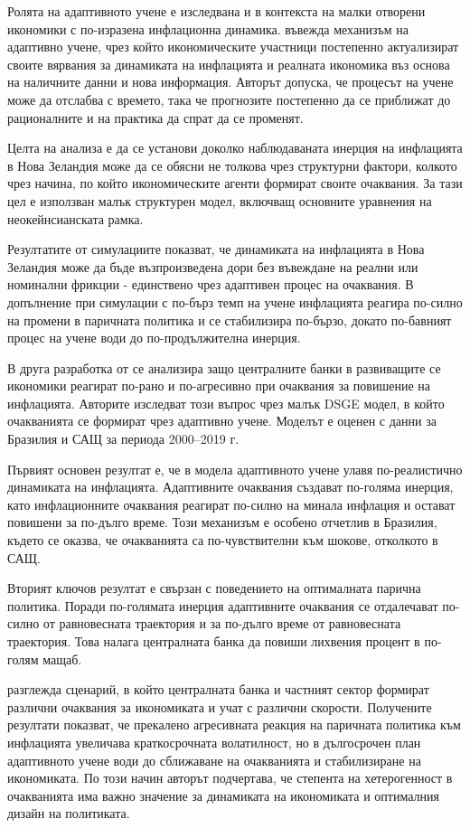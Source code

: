 Ролята на адаптивното учене е изследвана и в контекста на малки отворени икономики с по-изразена инфлационна динамика. \textcite{BASDEVANT20051074}  въвежда механизъм на адаптивно учене, чрез който икономическите участници постепенно актуализират своите вярвания за динамиката на инфлацията и реалната икономика въз основа на наличните данни и нова информация. Авторът допуска, че процесът на учене може да отслабва с времето, така че прогнозите постепенно да се приближат до рационалните и на практика да спрат да се променят. 

Целта на анализа е да се установи доколко наблюдаваната инерция на инфлацията в Нова Зеландия може да се обясни не толкова чрез структурни фактори, колкото чрез начина, по който икономическите агенти формират своите очаквания. За тази цел е използван малък структурен модел, включващ основните уравнения на неокейнсианската рамка.

Резултатите от симулациите показват, че динамиката на инфлацията в Нова Зеландия може да бъде възпроизведена дори без въвеждане на реални или номинални фрикции - единствено чрез адаптивен процес на очаквания. В допълнение при симулации с по-бърз темп на учене инфлацията реагира по-силно на промени в паричната политика и се стабилизира по-бързо, докато по-бавният процес на учене води до по-продължителна инерция.

В друга разработка от \textcite{DIZIOLI2024100119} се анализира защо централните банки в развиващите се икономики реагират по-рано и по-агресивно при очаквания за повишение на инфлацията. Авторите изследват този въпрос чрез малък DSGE модел, в който очакванията се формират чрез адаптивно учене. Моделът е оценен с данни за Бразилия и САЩ за периода 2000–2019 г.

Първият основен резултат е, че в модела адаптивното учене улавя по-реалистично динамиката на инфлацията. Адаптивните очаквания създават по-голяма инерция, като инфлационните очаквания реагират по-силно на минала инфлация и остават повишени за по-дълго време. Този механизъм е особено отчетлив в Бразилия, където се оказва, че очакванията са по-чувствителни към шокове, отколкото в САЩ.

Вторият ключов резултат е свързан с поведението на оптималната парична политика. Поради по-голямата инерция адаптивните очаквания се отдалечават по-силно от равновесната траектория и за по-дълго време от равновесната траектория. Това налага централната банка да повиши лихвения процент в по-голям мащаб.

 \textcite{Fukac2008} разглежда сценарий, в който централната банка и частният сектор формират различни очаквания за икономиката и учат с различни скорости. Получените резултати показват, че прекалено агресивната реакция на паричната политика към инфлацията увеличава краткосрочната волатилност, но в дългосрочен план адаптивното учене води до сближаване на очакванията и стабилизиране на икономиката. По този начин авторът подчертава, че степента на хетерогенност в очакванията има важно значение за динамиката на икономиката и оптималния дизайн на политиката.

